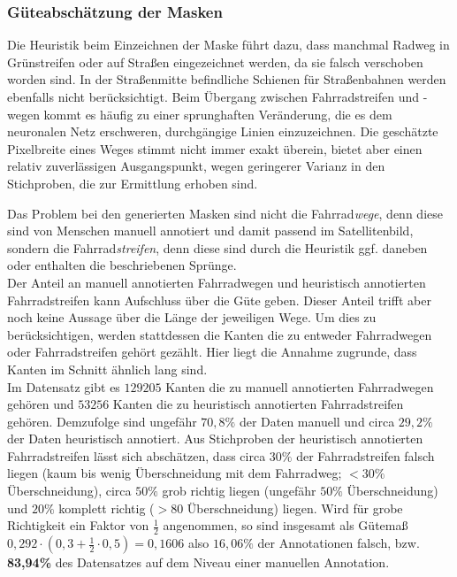 \subsubsection{Güteabschätzung der Masken}

Die Heuristik beim Einzeichnen der Maske führt dazu, dass manchmal Radweg in Grünstreifen oder auf Straßen eingezeichnet werden, da sie falsch verschoben worden sind.
In der Straßenmitte befindliche Schienen für Straßenbahnen werden ebenfalls nicht berücksichtigt.
Beim Übergang zwischen Fahrradstreifen und -wegen kommt es häufig zu einer sprunghaften Veränderung, die es dem neuronalen Netz erschweren, durchgängige Linien einzuzeichnen.
Die geschätzte Pixelbreite eines Weges stimmt nicht immer exakt überein, bietet aber einen relativ zuverlässigen Ausgangspunkt, wegen geringerer Varianz in den Stichproben, 
die zur Ermittlung erhoben sind.

Das Problem bei den generierten Masken sind nicht die Fahrrad\textit{wege}, denn diese sind von Menschen manuell annotiert und damit passend im Satellitenbild, 
sondern die Fahrrad\textit{streifen}, denn diese sind durch die Heuristik ggf. daneben oder enthalten die beschriebenen Sprünge. \\
Der Anteil an manuell annotierten Fahrradwegen und heuristisch annotierten Fahrradstreifen kann Aufschluss über die Güte geben. 
Dieser Anteil trifft aber noch keine Aussage über die Länge der jeweiligen Wege. Um dies zu berücksichtigen, werden stattdessen die Kanten die zu 
entweder Fahrradwegen oder Fahrradstreifen gehört gezählt. Hier liegt die Annahme zugrunde, dass Kanten im Schnitt ähnlich lang sind.\\
Im Datensatz gibt es $129205$ Kanten die zu manuell annotierten Fahrradwegen gehören und $53256$ Kanten die zu heuristisch annotierten Fahrradstreifen gehören. 
Demzufolge sind ungefähr $70,8\%$ der Daten manuell und circa $29,2\%$ der Daten heuristisch annotiert. 
Aus Stichproben der heuristisch annotierten Fahrradstreifen lässt sich abschätzen, dass circa $30\%$ der Fahrradstreifen falsch liegen 
(kaum bis wenig Überschneidung mit dem Fahrradweg; $<30\%$ Überschneidung), circa $50\%$ grob richtig liegen (ungefähr $50\%$ Überschneidung)
und $20\%$ komplett richtig ($>80$ Überschneidung) liegen. Wird für grobe Richtigkeit ein Faktor von $\frac{1}{2}$ angenommen, so sind insgesamt
als Gütemaß $0,292 \cdot (0,3 + \frac{1}{2} \cdot 0,5) = 0,1606$ also $16,06\%$ der Annotationen falsch, bzw. 
\textbf{83,94\%} des Datensatzes auf dem Niveau einer manuellen Annotation. 
   

